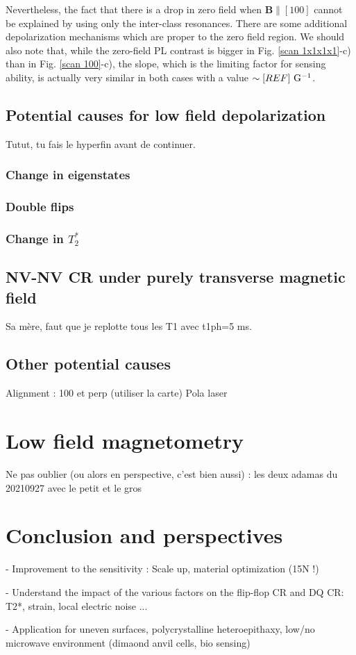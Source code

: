 \documentclass[a4paper,11pt]{report}
\begin{document}
Nevertheless, the fact that there is a drop in zero field when $\mathbf{B} \parallel [100]$ cannot be explained by using only the inter-class resonances. There are some additional depolarization mechanisms which are proper to the zero field region. We should also note that, while the zero-field PL contrast is bigger in Fig. \ref{scan 1x1x1x1}-c) than in Fig. \ref{scan 100}-c), the slope, which is the limiting factor for sensing ability, is actually very similar in both cases with a value $\sim [REF]\ \rm G^{-1}$.

\subsection{Potential causes for low field depolarization}

Tutut, tu fais le hyperfin avant de continuer.
\subsubsection{Change in eigenstates}

\subsubsection{Double flips}

\subsubsection{Change in $T_2^*$}

\subsection{NV-NV CR under purely transverse magnetic field}

Sa mère, faut que je replotte tous les T1 avec t1ph=5 ms.

\subsection{Other potential causes}
Alignment : 100 et perp (utiliser la carte)
Pola laser

\section{Low field magnetometry}

Ne pas oublier (ou alors en perspective, c'est bien aussi) : les deux adamas du 20210927 avec le petit et le gros 

\section{Conclusion and perspectives}
- Improvement to the sensitivity : Scale up, material optimization (15N !)

- Understand the impact of the various factors on the flip-flop CR and DQ CR: T2*, strain, local electric noise ...

- Application for uneven surfaces, polycrystalline heteroepithaxy, low/no microwave environment (dimaond anvil cells, bio sensing)

\printbibliography
\end{document}
